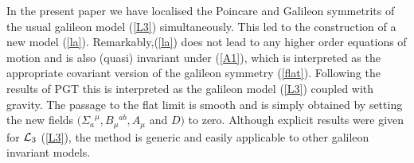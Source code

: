 \documentclass[12pt]{article}
\begin{document}
 In the present paper we have localised the Poincare and Galileon symmetrits of the usual galileon model (\ref{L3}) simultaneously. This led to the construction of a new model (\ref{la}). Remarkably,(\ref{la}) does not lead to any higher order equations of motion and is also (quasi) invariant under (\ref{A1}), which is interpreted as the appropriate covariant version of the galileon symmetry (\ref{flat}). Following the results of PGT this is interpreted as the galileon model (\ref{L3}) coupled with gravity.  The passage to the flat limit is smooth and is simply obtained by setting the new fields $({\Sigma_a}^{\mu}, B_{\mu}{}^{ab}, A_{\mu}$ and $D)$ to zero. Although explicit results were given for ${\cal{L}}_3$ (\ref{L3}), the method is generic and easily applicable to other galileon invariant models. 
\end{document}
